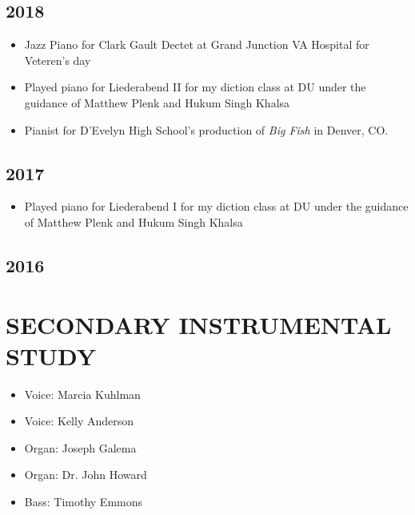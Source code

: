 \documentclass{article}
\newcommand{\cvItem}[1]{
        \item {
            {#1}
        }
    }
\newcommand{\cvItemListStart}{\begin{itemize}[leftmargin=10pt]}
\newcommand{\cvItemListEnd}{\end{itemize}}
\begin{document}
        \subsection{2018}
            \cvItemListStart
                \cvItem{Jazz Piano for Clark Gault Dectet at Grand Junction VA Hospital for
                Veteren's day}
                \cvItem{Played piano for Liederabend II for my diction class at DU under the guidance
                of Matthew Plenk and Hukum Singh Khalsa}
                \cvItem{Pianist for D'Evelyn High School's production of {\em Big Fish} in Denver, CO.}
            \cvItemListEnd
        \subsection{2017}
            \cvItemListStart
                \cvItem{Played piano for Liederabend I for my diction class at DU under the guidance
                of Matthew Plenk and Hukum Singh Khalsa}
            \cvItemListEnd
        \subsection{2016}

    \section{SECONDARY INSTRUMENTAL STUDY}
        \cvItemListStart
            \cvItem{Voice: Marcia Kuhlman}
            \cvItem{Voice: Kelly Anderson}
            \cvItem{Organ: Joseph Galema}
            \cvItem{Organ: Dr. John Howard}
            \cvItem{Bass: Timothy Emmons}
        \cvItemListEnd
\end{document}
